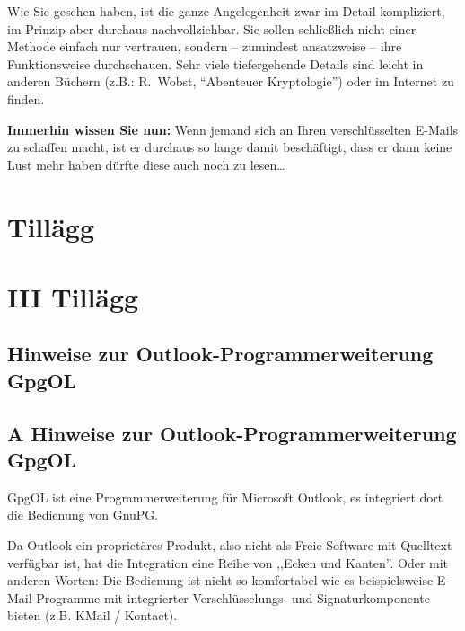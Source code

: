 \documentclass[a4paper,11pt, oneside,openright,titlepage,dvips]{scrbook}
\newcommand{\Email}{E-Mail}
\newcounter{part}
\newcounter{chapter}
\begin{document}
Wie Sie gesehen haben, ist die ganze Angelegenheit zwar im Detail
kompliziert, im Prinzip aber durchaus nachvollziehbar. Sie sollen
schließlich nicht einer Methode einfach nur vertrauen, sondern ­--
zumindest ansatzweise ­-- ihre Funktionsweise durchschauen. Sehr viele
tiefergehende Details sind leicht in anderen Büchern (z.B.: R.~Wobst,
"`Abenteuer Kryptologie"') oder im Internet zu finden.


\vfill

\textbf{Immerhin wissen Sie nun:} Wenn jemand sich an Ihren verschlüsselten
\Email{}s zu schaffen macht, ist er durchaus so lange damit beschäftigt,
dass er dann keine Lust mehr haben dürfte diese auch noch zu lesen\ldots







\appendix
\T\part{Tillägg}
\W\part*{\textbf{III Tillägg}}


\T\chapter{Hinweise zur Outlook-Programmerweiterung GpgOL}
\W\chapter*{A Hinweise zur Outlook-Programmerweiterung GpgOL}
\label{appendix:gpgol}

GpgOL ist eine Programmerweiterung für Microsoft Outlook, es integriert dort die
Bedienung von GnuPG.

Da Outlook ein proprietäres Produkt, also nicht als Freie Software
mit Quelltext verfügbar ist, hat die Integration eine Reihe von
,,Ecken und Kanten''. Oder mit anderen Worten: Die Bedienung ist nicht
so komfortabel wie es beispielsweise \Email{}-Programme mit integrierter
Verschlüsselungs- und Signaturkomponente bieten (z.B. KMail / Kontact).
\end{document}
